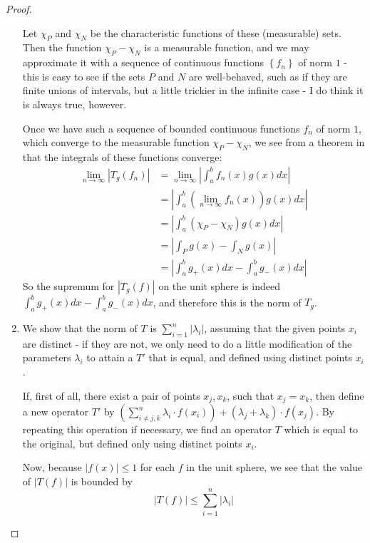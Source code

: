 \documentclass[12pt]{article}
\theoremstyle{definition}
\begin{document}
\begin{proof}
\begin{enumerate}[label=(\roman*)]
		\par Let $\chi_P$ and $\chi_N$ be the characteristic functions of these (measurable) sets. Then the function $\chi_P - \chi_N$ is a measurable function, and we may approximate it with a sequence of continuous functions $\left\{ f_n \right\}$ of norm $1$ - this is easy to see if the sets $P$ and $N$ are well-behaved, such as if they are finite unions of intervals, but a little trickier in the infinite case - I do think it is always true, however.
		\par Once we have such a sequence of bounded continuous functions $f_n$ of norm $1$, which converge to the measurable function $\chi_P - \chi_N$, we see from a theorem in \cite{rudin} that the integrals of these functions converge:
		\begin{align*}
			\lim_{n\to \infty}\left \lvert { T_g(f_n) } \right \lvert &= \lim_{n\to \infty}\left \lvert\int_a^b f_n(x)g(x)dx\right \rvert\\
			&= \left \lvert\int_a^b (\lim_{n\to\infty}f_n(x))g(x)dx\right \rvert\\
			&= \left \lvert\int_a^b (\chi_P - \chi_N)g(x)dx\right \rvert\\
			&= \left \lvert \int_P g(x) - \int_N g(x)\right\rvert\\
			&= \left \lvert { \int_a^b g_+(x)dx - \int_a^b g_-(x)dx } \right \lvert 
		\end{align*}
		So the supremum for $\left \lvert { T_g(f) } \right \lvert $ on the unit sphere is indeed $\int_a^b g_+(x)dx - \int_a^b g_-(x)dx$, and therefore this is the norm of $T_g$.
	\item We show that the norm of $T$ is $\sum_{i=1}^n \left \lvert { \lambda_i } \right \lvert $, assuming that the given points $x_i$ are distinct - if they are not, we only need to do a little modification of the parameters $ \lambda_i$ to attain a $T'$ that is equal, and defined using distinct points $x_i$. 
	\par If, first of all, there exist a pair of points $x_j, x_k$, such that $x_j = x_k$, then define a new operator $T'$ by $\left (\sum_{i \neq j, k}^n \lambda_i \cdot f(x_i) \right )+ (\lambda_j + \lambda_k) \cdot f(x_j)$. By repeating this operation if necessary, we find an operator $T$ which is equal to the original, but defined only using distinct points $x_i$.
	\par Now, because $\left \lvert { f(x) } \right \lvert \leq 1$ for each $f$ in the unit sphere, we see that the value of $\left \lvert { T(f) } \right \lvert $ is bounded by 
	\[ \left \lvert { T(f) } \right \lvert \leq  { \sum_{i=1}^n } \left \lvert \lambda_i \right \lvert \]

\end{enumerate}
\end{proof}
\end{document}
